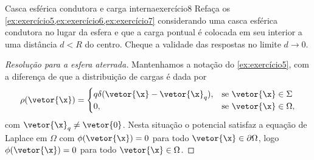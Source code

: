 \begin{exercício}{Casca esférica condutora e carga interna}{exercício8}
    Refaça os \cref{ex:exercício5,ex:exercício6,ex:exercício7} considerando uma casca esférica condutora no lugar da esfera e que a carga pontual é colocada em seu interior a uma distância \(d < R\) do centro. Cheque a validade das respostas no limite \(d \to 0\).
\end{exercício}
\begin{proof}[Resolução para a esfera aterrada]
    Mantenhamos a notação do \cref{ex:exercício5}, com a diferença de que a distribuição de cargas é dada por
    \begin{equation*}
        \rho(\vetor{\x}) = \begin{cases}
            q \delta(\vetor{\x} - \vetor{\x}_q), &\text{se }\vetor{\x} \in \Sigma\\
            0, &\text{se }\vetor{\x} \in \Omega,
        \end{cases}
    \end{equation*}
    com \(\vetor{\x}_q \neq \vetor{0}\). Nesta situação o potencial satisfaz a equação de Laplace em \(\Omega\) com \(\phi(\vetor{\x})= 0\) para todo \(\vetor{\x} \in \partial \Omega\), logo \(\phi(\vetor{\x}) = 0\) para todo \(\vetor{\x} \in \Omega\).


\end{proof}
